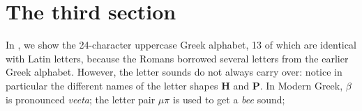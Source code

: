 \blah

\blah

\blah

\blah

\blah

\section{The third section}

\blah

In , we show the 24-character uppercase Greek
alphabet, 13 of which are identical with Latin letters, because the
Romans borrowed several letters from the earlier Greek alphabet.
However, the letter sounds do not always carry over: notice in
particular the different names of the letter shapes \textbf{H} and
\textbf{P}.  In Modern Greek, {\boldmath $\beta$} is pronounced
\emph{veeta}; the letter pair {\boldmath $\mu\!\pi$} is used to get a
\emph{bee} sound;

\blah

